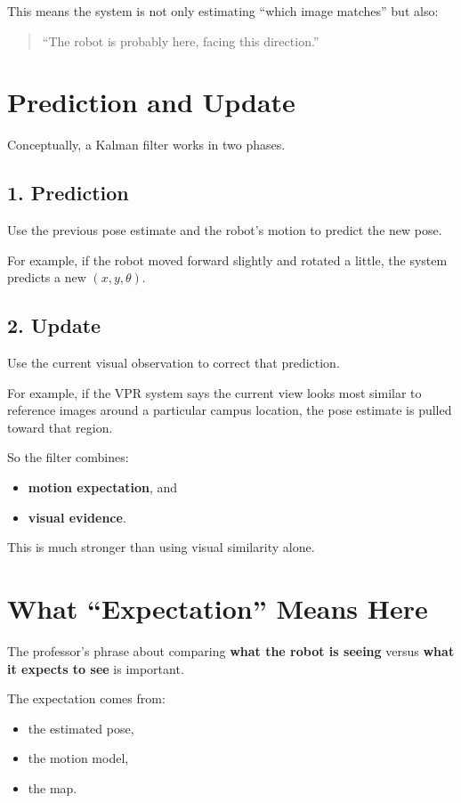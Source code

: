 \documentclass[11pt]{article}
\begin{document}
This means the system is not only estimating ``which image matches'' but also:
\begin{quote}
``The robot is probably here, facing this direction.''
\end{quote}

\section*{Prediction and Update}
Conceptually, a Kalman filter works in two phases.

\subsection*{1. Prediction}
Use the previous pose estimate and the robot's motion to predict the new pose.

For example, if the robot moved forward slightly and rotated a little, the system predicts a new $(x, y, \theta)$.

\subsection*{2. Update}
Use the current visual observation to correct that prediction.

For example, if the VPR system says the current view looks most similar to reference images around a particular campus location, the pose estimate is pulled toward that region.

So the filter combines:
\begin{itemize}[leftmargin=*]
  \item \textbf{motion expectation}, and
  \item \textbf{visual evidence}.
\end{itemize}

This is much stronger than using visual similarity alone.

\section*{What ``Expectation'' Means Here}
The professor's phrase about comparing \textbf{what the robot is seeing} versus \textbf{what it expects to see} is important.

The expectation comes from:
\begin{itemize}[leftmargin=*]
  \item the estimated pose,
  \item the motion model,
  \item the map.
\end{itemize}
\end{document}
